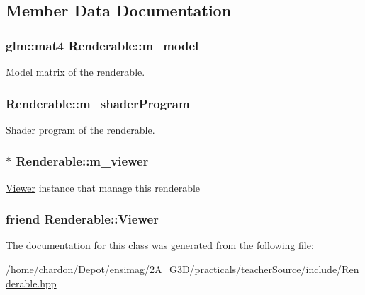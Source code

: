 \subsection{Member Data Documentation}
\hypertarget{classRenderable_ab3a7f6112bd9d8c37ab10dac24186b25}{
\subsubsection[{m\+\_\+model}]{\setlength{\rightskip}{0pt plus 5cm}glm\+::mat4 Renderable\+::m\+\_\+model\hspace{0.3cm}{\ttfamily [protected]}}}\label{classRenderable_ab3a7f6112bd9d8c37ab10dac24186b25}
Model matrix of the renderable. \hypertarget{classRenderable_ad4004cea2d9ca6cc91eb03b4ce885088}{
\subsubsection[{m\+\_\+shader\+Program}]{ Renderable\+::m\+\_\+shader\+Program\hspace{0.3cm}{\ttfamily [protected]}}}\label{classRenderable_ad4004cea2d9ca6cc91eb03b4ce885088}
Shader program of the renderable. \hypertarget{classRenderable_a691422fa44ec05fae13d94902870d6c0}{
\subsubsection[{m\+\_\+viewer}]{$\ast$ Renderable\+::m\+\_\+viewer\hspace{0.3cm}{\ttfamily [protected]}}}\label{classRenderable_a691422fa44ec05fae13d94902870d6c0}
\hyperlink{classViewer}{Viewer} instance that manage this renderable \hypertarget{classRenderable_aaf644a3bff63df86024c9ad960d00e74}{
\subsubsection[{Viewer}]{\setlength{\rightskip}{0pt plus 5cm}friend Renderable\+::\+Viewer\hspace{0.3cm}{\ttfamily [protected]}}}\label{classRenderable_aaf644a3bff63df86024c9ad960d00e74}


The documentation for this class was generated from the following file\+:\begin{DoxyCompactItemize}
\item 
/home/chardon/\+Depot/ensimag/2\+A\+\_\+\+G3\+D/practicals/teacher\+Source/include/\hyperlink{Renderable_8hpp}{Renderable.\+hpp}\end{DoxyCompactItemize}
